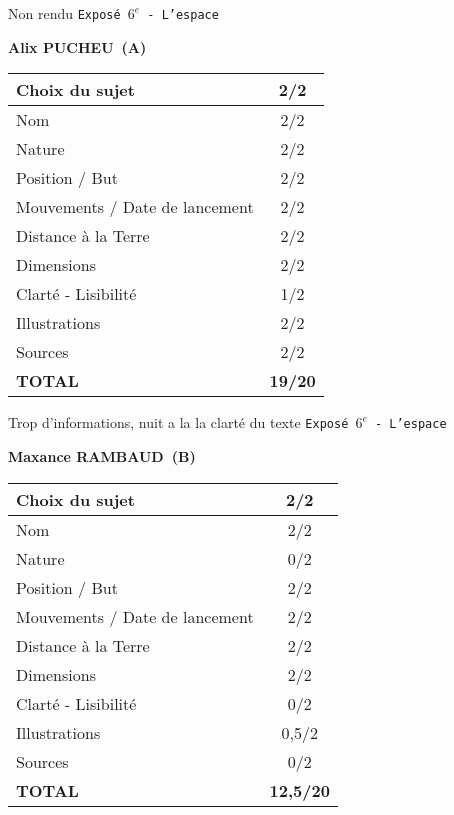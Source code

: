 	\vspace*{1cm}
	Non rendu
	\newpage
	\LARGE{\texttt{Expos\'e $6^e$ - L'espace}}
	\vspace*{1cm}

	\textbf{Alix PUCHEU\ (A)}

	\vspace*{1.5cm}
	\begin{tabular}{|l|c|}
		\hline
		Choix du sujet & 2/2 \\
		\hline
		Nom & 2/2 \\
		\hline
		Nature & 2/2 \\
		\hline
		Position / But & 2/2 \\
		\hline
		Mouvements / Date de lancement & 2/2 \\
		\hline
		Distance \`a la Terre & 2/2 \\
		\hline
		Dimensions & 2/2 \\
		\hline
		Clart\'e - Lisibilit\'e & 1/2 \\
		\hline
		Illustrations & 2/2 \\
		\hline
		Sources & 2/2 \\
		\hline
		\textbf{TOTAL}  & \textbf{19/20} \\
		\hline
	\end{tabular}

	\vspace*{1cm}
	Trop d'informations, nuit a la la clart\'e du texte
	\newpage
	\LARGE{\texttt{Expos\'e $6^e$ - L'espace}}
	\vspace*{1cm}

	\textbf{Maxance RAMBAUD\ (B)}

	\vspace*{1.5cm}
	\begin{tabular}{|l|c|}
		\hline
		Choix du sujet & 2/2 \\
		\hline
		Nom & 2/2 \\
		\hline
		Nature & 0/2 \\
		\hline
		Position / But & 2/2 \\
		\hline
		Mouvements / Date de lancement & 2/2 \\
		\hline
		Distance \`a la Terre & 2/2 \\
		\hline
		Dimensions & 2/2 \\
		\hline
		Clart\'e - Lisibilit\'e & 0/2 \\
		\hline
		Illustrations & 0,5/2 \\
		\hline
		Sources & 0/2 \\
		\hline
		\textbf{TOTAL}  & \textbf{12,5/20} \\
		\hline
	\end{tabular}

